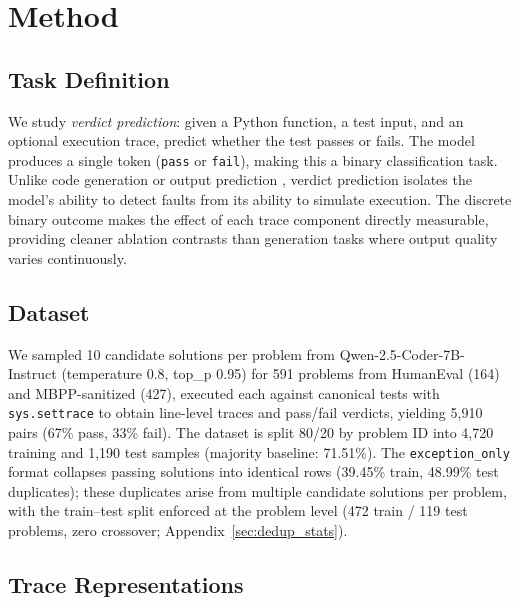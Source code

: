 \section{Method}

\subsection{Task Definition}

We study \emph{verdict prediction}: given a Python function, a test input, and an optional execution trace, predict whether the test passes or fails.
The model produces a single token (\texttt{pass} or \texttt{fail}), making this a binary classification task.
Unlike code generation \citep{chen2025tracepile} or output prediction \citep{gu2024cruxeval}, verdict prediction isolates the model's ability to detect faults from its ability to simulate execution.
The discrete binary outcome makes the effect of each trace component directly measurable, providing cleaner ablation contrasts than generation tasks where output quality varies continuously.

\subsection{Dataset}
\label{sec:dataset}

We sampled 10 candidate solutions per problem from Qwen-2.5-Coder-7B-Instruct (temperature 0.8, top\_p 0.95) for 591 problems from HumanEval \citep{chen2021evaluating} (164) and MBPP-sanitized \citep{austin2021program} (427), executed each against canonical tests with \texttt{sys.settrace} to obtain line-level traces and pass/fail verdicts, yielding 5,910 pairs (67\% pass, 33\% fail).
The dataset is split 80/20 by problem ID into 4,720 training and 1,190 test samples (majority baseline: 71.51\%).
The \texttt{exception\_only} format collapses passing solutions into identical rows (39.45\% train, 48.99\% test duplicates); these duplicates arise from multiple candidate solutions per problem, with the train--test split enforced at the problem level (472 train / 119 test problems, zero crossover; Appendix~\ref{sec:dedup_stats}).

\subsection{Trace Representations}

